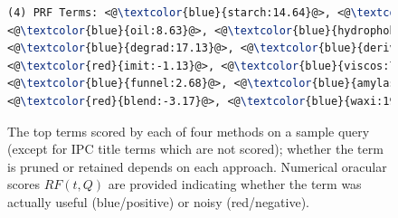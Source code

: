 \begin{figure}[htpb]
\begin{framed}
\begin{lstlisting}[basicstyle=\small\ttfamily , linewidth=\columnwidth,breaklines=true, language=TeX]
(4) PRF Terms: <@\textcolor{blue}{starch:14.64}@>, <@\textcolor{blue}{encapsul:17.50}@>, <@\textcolor{red}{chees:-4.22}@>, 
<@\textcolor{blue}{oil:8.63}@>, <@\textcolor{blue}{hydrophob:5.45}@>, <@\textcolor{blue}{agent:5.19}@>, <@\textcolor{red}{casein:-2.19}@>, 
<@\textcolor{blue}{degrad:17.13}@>, <@\textcolor{blue}{deriv:11.97}@>, <@\textcolor{blue}{tablet:5.30}@>, <@\textcolor{red}{debranch:-10.58}@>, 
<@\textcolor{red}{imit:-1.13}@>, <@\textcolor{blue}{viscos:7.77}@>, <@\textcolor{blue}{oxid:5.97}@>, <@\textcolor{blue}{activ:5.98}@>, <@\textcolor{blue}{osa:9.32}@>, 
<@\textcolor{blue}{funnel:2.68}@>, <@\textcolor{blue}{amylas:26.06}@>, <@\textcolor{red}{amylopectin:-7.14}@>, <@\textcolor{blue}{maiz:20.61}@>, 
<@\textcolor{red}{blend:-3.17}@>, <@\textcolor{blue}{waxi:19.41}@>, <@\textcolor{blue}{convert:31.81}@>, 

 \end{lstlisting} 
 \vspace*{-2ex}
\end{framed}
 \vspace*{-2ex}
  \caption{The top terms scored by each of four methods on a sample
    query (except for IPC title terms which are not scored); whether the term is
    pruned or retained depends on each approach.
    Numerical oracular scores $\mathit{RF}(t,Q)$ are provided
    indicating whether the term was actually useful (blue/positive) or
    noisy (red/negative).}
  \label{fig:anecdotal}  
\end{figure}

